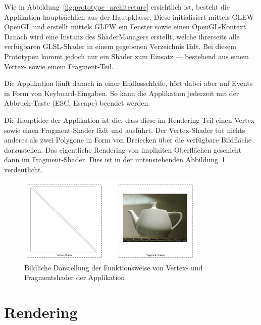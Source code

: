 Wie in Abbildung~\ref{fig:prototype_architecture} ersichtlich ist, besteht
die Applikation hauptsächlich aus der Hautpklasse. Diese initialisiert
mittels GLEW OpenGL und erstellt mittels GLFW ein Fenster sowie einen
OpenGL-Kontext. Danach wird eine Instanz des ShaderManagers erstellt,
welche ihrerseits alle verfügbaren GLSL-Shader in einem gegebenen
Verzeichnis lädt. Bei diesem Prototypen kommt jedoch nur ein Shader zum
Einsatz --- bestehend aus einem Vertex- sowie einem Fragment-Teil.

Die Applikation läuft danach in einer Endlosschleife, hört dabei aber
auf Events in Form von Keyboard-Eingaben. So kann die Applikation
jederzeit mit der Abbruch-Taste (ESC, Escape) beendet werden.

Die Hauptidee der Applikation ist die, dass diese im Rendering-Teil
einen Vertex- sowie einen Fragment-Shader lädt und ausführt. Der
Vertex-Shader tut nichts anderes als zwei Polygone in Form von Dreiecken
über die verfügbare Bildfläche darzustellen. Das eigentliche Rendering
von impliziten Oberflächen geschieht dann im Fragment-Shader. Dies ist
in der untenstehenden Abbildung~\ref{fig:prototype_shaders} verdeutlicht.

\begin{figure}[H]
    \centering
    \includegraphics[width=0.8\textwidth]{img/prototype_shaders.png}
    \caption{Bildliche Darstellung der Funktionsweise von Vertex- und
        Fragmentshader der Applikation\protect\footnotemark}\label{fig:prototype_shaders}
\end{figure}

\section{Rendering}
\label{sec:rendering}

